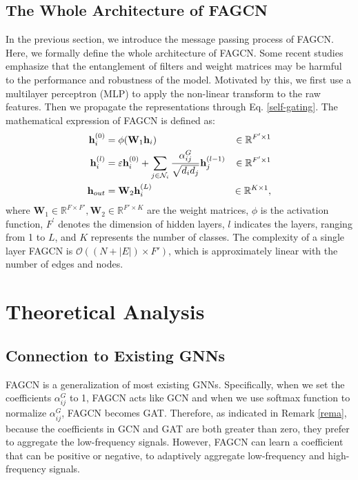 \documentclass[letterpaper]{article} %
\begin{document}
\subsection{The Whole Architecture of FAGCN}
In the previous section, we introduce the message passing process of FAGCN. Here, we formally define the whole architecture of FAGCN. Some recent studies \cite{SGC, cui2020adaptive} emphasize that the entanglement of filters and weight matrices may be harmful to the performance and robustness of the model. Motivated by this, we first use a multilayer perceptron (MLP) to apply the non-linear transform to the raw features. Then we propagate the representations through Eq. \ref{self-gating}. The mathematical expression of FAGCN is defined as:
\begin{align}
    \mathbf{h}^{(0)}_{i} & = \phi(\mathbf{W}_{1}\mathbf{h}_{i}) & \in \mathbb{R}^{F' \times 1} \notag \\
    \mathbf{h}^{(l)}_{i} & = \varepsilon \mathbf{h}^{(0)}_{i} + \sum_{j \in \mathcal{N}_{i}} \frac{\alpha_{ij}^{G}}{\sqrt{d_{i}d_{j}}} \mathbf{h}^{(l-1)}_{j} & \in \mathbb{R}^{F' \times 1} \notag \\
    \mathbf{h}_{out} & = \mathbf{W}_{2}\mathbf{h}^{(L)}_{i} & \in \mathbb{R}^{K \times 1},
\end{align}
where $\mathbf{W}_{1} \in \mathbb{R}^{F \times F'}, \mathbf{W}_{2} \in \mathbb{R}^{F' \times K}$ are the weight matrices, $\phi$ is the activation function, $F^{'}$ denotes the dimension of hidden layers, $l$ indicates the layers, ranging from 1 to $L$, and $K$ represents the number of classes.
The complexity of a single layer FAGCN is $\mathcal{O}((N + |E|) \times F')$, which is approximately linear with the number of edges and nodes.

\section{Theoretical Analysis}
\label{theory}

\subsection{Connection to Existing GNNs}

FAGCN is a generalization of most existing GNNs. Specifically, when we set the coefficients $\alpha_{ij}^{G}$ to 1, FAGCN acts like GCN and when we use softmax function to normalize $\alpha_{ij}^{G}$, FAGCN becomes GAT.
Therefore, as indicated in Remark \ref{rema}, because the coefficients in GCN and GAT are both greater than zero, they prefer to aggregate the low-frequency signals. However, FAGCN can learn a coefficient that can be positive or negative, to adaptively aggregate low-frequency and high-frequency signals.
\end{document}

